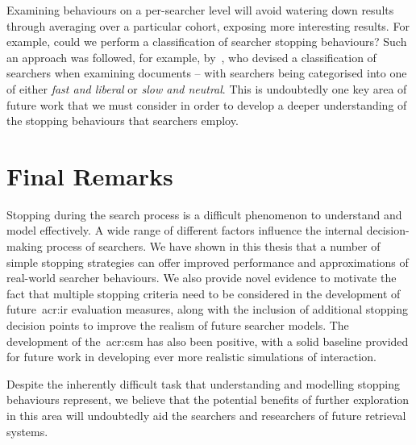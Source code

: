 Examining behaviours on a per-searcher level will avoid watering down results through averaging over a particular cohort, exposing more interesting results. For example, could we perform a classification of searcher stopping behaviours? Such an approach was followed, for example, by~\cite{smucker2011user_strategies}, who devised a classification of searchers when examining documents -- with searchers being categorised into one of either \emph{fast and liberal} or \emph{slow and neutral}. This is undoubtedly one key area of future work that we must consider in order to develop a deeper understanding of the stopping behaviours that searchers employ.

\section{Final Remarks}\label{sec:conclusions:remarks}
Stopping during the search process is a difficult phenomenon to understand and model effectively. A wide range of different factors influence the internal decision-making process of searchers. We have shown in this thesis that a number of simple stopping strategies can offer improved performance and approximations of real-world searcher behaviours. We also provide novel evidence to motivate the fact that multiple stopping criteria need to be considered in the development of future~\gls{acr:ir} evaluation measures, along with the inclusion of additional stopping decision points to improve the realism of future searcher models. The development of the~\gls{acr:csm} has also been positive, with a solid baseline provided for future work in developing ever more realistic simulations of interaction.

Despite the inherently difficult task that understanding and modelling stopping behaviours represent, we believe that the potential benefits of further exploration in this area will undoubtedly aid the searchers and researchers of future retrieval systems.


\newpage
\thispagestyle{empty}
\mbox{}

